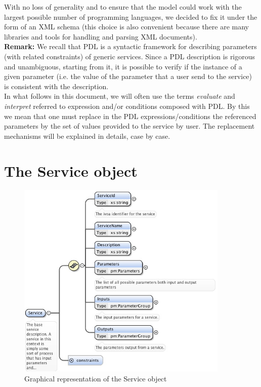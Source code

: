 \documentclass[a4paper,11pt] {article}
\begin{document}
With no loss of generality and to ensure that the model could work with the largest possible number
of programming languages, we decided to fix it under the form of an XML schema (this choice is also
convenient because there are many libraries and tools for handling and parsing XML documents).\\


{\bf Remark:} We recall that PDL is a syntactic framework for describing parameters (with related
constraints) of generic services. Since a PDL description is rigorous and unambiguous, starting from
it, it is possible to verify if the instance of a given parameter (i.e. the value of the parameter
that a user send to the service) is consistent with the description.\\
In what follows in this document, we will often use the terms {\it evaluate} and {\it interpret}
referred to expression and/or conditions composed with PDL. By this we mean that one must replace in
the PDL expressions/conditions the referenced parameters  by the set of values provided to the
service by user. The replacement mechanisms will be explained in details, case by case.


\section{The Service object}\label{par-service}

\begin{figure}[htbp]
\begin{center}
\includegraphics[width=0.9\textwidth]{pictures/Service.jpg} 
\caption{Graphical representation of the Service object}
\label{Pic-Service}
\end{center}
\end{figure}
\end{document}

